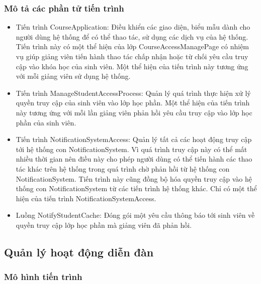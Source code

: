 \documentclass[./../main.tex]{subfiles}
\begin{document}
\subsubsection{Mô tả các phần tử tiến trình}
\begin{itemize}
	\item Tiến trình CourseApplication: Điều khiển các giao diện, biểu mẫu dành cho người dùng hệ thống để có thể thao tác, sử dụng các dịch vụ của hệ thống. Tiến trình này có một thể hiện của lớp CourseAccessManagePage có nhiệm vụ giúp giảng viên tiến hành thao tác chấp nhận hoặc từ chối yêu cầu truy cập vào khóa học của sinh viên.
	Một thể hiện của tiến trình này tương ứng với mỗi giảng viên sử dụng hệ thống.
	\item Tiến trình ManageStudentAccessProcess: Quản lý quá trình thực hiện xử lý quyền truy cập của sinh viên vào lớp học phần.
	Một thể hiện của tiến trình này tương ứng với mỗi lần giảng viên phản hồi yêu cầu truy cập vào lớp học phần của sinh viên.
	\item Tiến trình NotificationSystemAccess: Quản lý tất cả các hoạt động truy cập tới hệ thống con NotificationSystem. Vì quá trình truy cập này có thể mất nhiều thời gian nên điều này cho phép người dùng có thể tiến hành các thao tác khác trên hệ thống trong quá trình chờ phản hồi từ hệ thống con NotificationSystem. Tiến trình này cũng đồng bộ hóa quyền truy cập vào hệ thống con NotificationSystem từ các tiến trình hệ thống khác.
	Chỉ có một thể hiện của tiến trình NotificationSystemAccess.
	\item Luồng NotifyStudentCache: Đóng gói một yêu cầu thông báo tới sinh viên về quyền truy cập lớp học phần mà giảng viên đã phản hồi.
\end{itemize}

\subsection{Quản lý hoạt động diễn đàn}

\subsubsection{Mô hình tiến trình}
\end{document}
